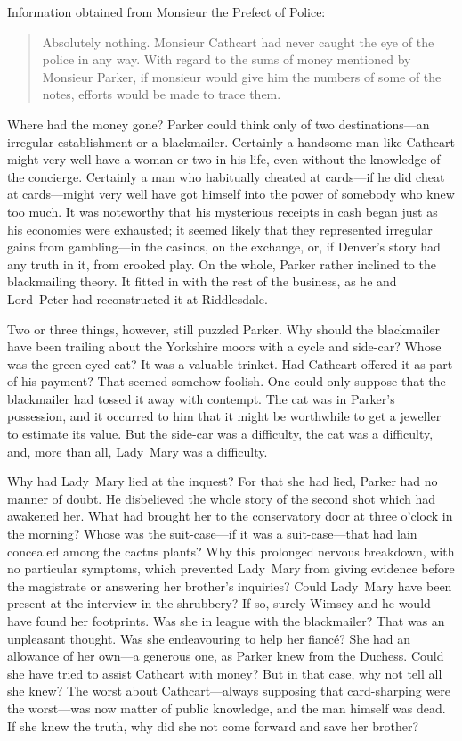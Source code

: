 Information obtained from Monsieur the Prefect of Police:

\begin{quote}
Absolutely nothing. Monsieur Cathcart had never caught the eye of the police in any way. With regard to the sums of money mentioned by Monsieur Parker, if monsieur would give him the numbers of some of the notes, efforts would be made to trace them.
\end{quote}

Where had the money gone? Parker could think only of two destinations—an irregular establishment or a blackmailer. Certainly a handsome man like Cathcart might very well have a woman or two in his life, even without the knowledge of the concierge. Certainly a man who habitually cheated at cards—if he did cheat at cards—might very well have got himself into the power of somebody who knew too much.  It was noteworthy that his mysterious receipts in cash began just as his economies were exhausted; it seemed likely that they represented irregular gains from gambling—in the casinos, on the exchange, or, if Denver's story had any truth in it, from crooked play. On the whole, Parker rather inclined to the blackmailing theory. It fitted in with the rest of the business, as he and Lord~Peter had reconstructed it at Riddlesdale.

Two or three things, however, still puzzled Parker. Why should the blackmailer have been trailing about the Yorkshire moors with a cycle and side-car? Whose was the green-eyed cat? It was a valuable trinket.  Had Cathcart offered it as part of his payment? That seemed somehow foolish. One could only suppose that the blackmailer had tossed it away with contempt. The cat was in Parker's possession, and it occurred to him that it might be worthwhile to get a jeweller to estimate its value.  But the side-car was a difficulty, the cat was a difficulty, and, more than all, Lady~Mary was a difficulty.

Why had Lady~Mary lied at the inquest? For that she had lied, Parker had no manner of doubt. He disbelieved the whole story of the second shot which had awakened her. What had brought her to the conservatory door at three o'clock in the morning? Whose was the suit-case—if it was a suit-case—that had lain concealed among the cactus plants? Why this prolonged nervous breakdown, with no particular symptoms, which prevented Lady~Mary from giving evidence before the magistrate or answering her brother's inquiries? Could Lady~Mary have been present at the interview in the shrubbery? If so, surely Wimsey and he would have found her footprints. Was she in league with the blackmailer? That was an unpleasant thought. Was she endeavouring to help her fiancé? She had an allowance of her own—a generous one, as Parker knew from the Duchess. Could she have tried to assist Cathcart with money? But in that case, why not tell all she knew? The worst about Cathcart—always supposing that card-sharping were the worst—was now matter of public knowledge, and the man himself was dead. If she knew the truth, why did she not come forward and save her brother?

